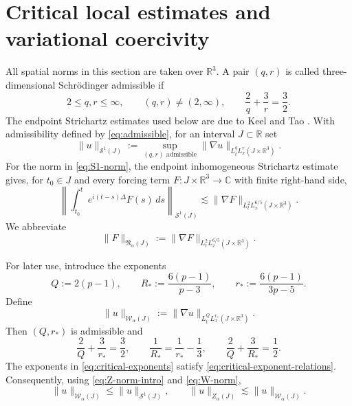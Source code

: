 \documentclass[preprint,12pt]{elsarticle}
\numberwithin{equation}{section}
\theoremstyle{remark}
\newcommand{\R}{\mathbb R}
\newcommand{\C}{\mathbb C}
\newcommand{\dd}{\,d}
\newcommand{\Znorm}{Z_{\alpha}}
\newcommand{\Wnorm}{\mathcal W_{\alpha}}
\newcommand{\Nnorm}{\mathfrak N_{\alpha}}
\begin{document}
\section{Critical local estimates and variational coercivity}

All spatial norms in this section are taken over $\R^3$. A pair $(q,r)$ is called three-dimensional Schr\"odinger admissible if
\begin{equation}\label{eq:admissible}
  2\le q,r\le\infty,
  \qquad (q,r)\ne(2,\infty),
  \qquad \frac2q+\frac3r=\frac32.
\end{equation}
The endpoint Strichartz estimates used below are due to Keel and Tao \cite{KeelTao1998}. With admissibility defined by \eqref{eq:admissible}, for an interval $J\subset\R$ set
\begin{equation}\label{eq:S1-norm}
  \|u\|_{\mathcal S^1(J)}
  :=\sup_{(q,r)\text{ admissible}}
  \|\nabla u\|_{L_t^qL_x^r(J\times\R^3)}.
\end{equation}
For the norm in \eqref{eq:S1-norm}, the endpoint inhomogeneous Strichartz estimate gives, for $t_0\in J$ and every forcing term $F:J\times\R^3\to\C$ with finite right-hand side,
\begin{equation}\label{eq:inhom-Strichartz}
  \left\|\int_{t_0}^t e^{i(t-s)\Delta}F(s)\dd s\right\|_{\mathcal S^1(J)}
  \lesssim
  \|\nabla F\|_{L_t^2L_x^{6/5}(J\times\R^3)}.
\end{equation}
We abbreviate
\begin{equation}\label{eq:N-norm}
  \|F\|_{\Nnorm(J)}
  :=\|\nabla F\|_{L_t^2L_x^{6/5}(J\times\R^3)}.
\end{equation}

For later use, introduce the exponents
\begin{equation}\label{eq:critical-exponents}
  Q:=2(p-1),
  \qquad R_*:=\frac{6(p-1)}{p-3},
  \qquad r_*:=\frac{6(p-1)}{3p-5}.
\end{equation}
Define
\begin{equation}\label{eq:W-norm}
  \|u\|_{\Wnorm(J)}
  :=\|\nabla u\|_{L_t^Q L_x^{r_*}(J\times\R^3)}.
\end{equation}
Then $(Q,r_*)$ is admissible and
\begin{equation}\label{eq:critical-exponent-relations}
  \frac2Q+\frac3{r_*}=\frac32,
  \qquad
  \frac1{R_*}=\frac1{r_*}-\frac13,
  \qquad
  \frac2Q+\frac3{R_*}=\frac12.
\end{equation}
The exponents in \eqref{eq:critical-exponents} satisfy \eqref{eq:critical-exponent-relations}. Consequently, using \eqref{eq:Z-norm-intro} and \eqref{eq:W-norm},
\begin{equation}\label{eq:W-below-S}
  \|u\|_{\Wnorm(J)}\le \|u\|_{\mathcal S^1(J)},
  \qquad
  \|u\|_{\Znorm(J)}\lesssim \|u\|_{\Wnorm(J)}.
\end{equation}
\end{document}
